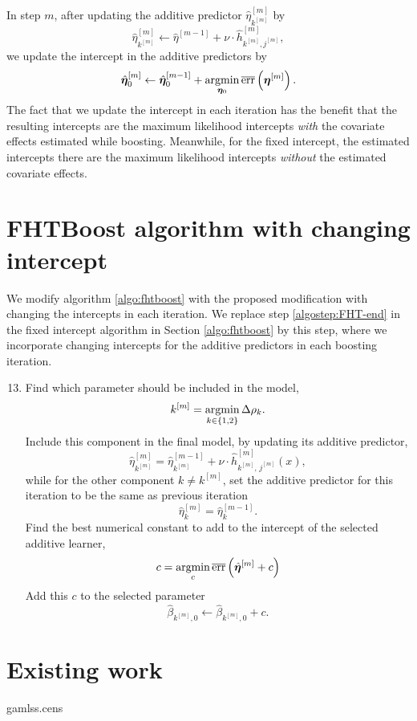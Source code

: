 In step $m$, after updating the additive predictor $\hat{\eta}^{[m]}_{k^{[m]}}$ by
\begin{equation*}
    \hat{\eta}^{[m]}_{k^{[m]}}\gets\hat{\eta}^{[m-1]}+\nu\cdot\hat{h}_{k^{[m]},j^{[m]}}^{[m]},
\end{equation*}
we update the intercept in the additive predictors by
\begin{equation*}
    \hat{\boldsymbol{\eta}}_0^{[m]}\gets\hat{\boldsymbol{\eta}}_0^{[m-1]}+\operatorname*{argmin}_{\boldsymbol{\eta}_0}\overline{\text{err}}\left(\boldsymbol{\eta}^{[m]}\right).
\end{equation*}
The fact that we update the intercept in each iteration has the benefit that the resulting intercepts are the maximum likelihood intercepts \textit{with} the covariate effects estimated while boosting.
Meanwhile, for the fixed intercept, the estimated intercepts there are the maximum likelihood intercepts \textit{without} the estimated covariate effects.


\section{FHTBoost algorithm with changing intercept}\label{subsec:FHT-intercept}
We modify algorithm \ref{algo:fhtboost} with the proposed modification with changing the intercepts in each iteration.
We replace step \ref{algostep:FHT-end} in the fixed intercept algorithm in Section \ref{algo:fhtboost} by this step, where we incorporate changing intercepts for the additive predictors in each boosting iteration.
\label{algo:fhtboost-with-intercept}
\begin{enumerate}
    \setcounter{enumi}{12}
    \item
        Find which parameter should be included in the model,
        \begin{equation*}
            k^{[m]}=\operatorname*{argmin}_{k\in\{1,2\}}\Delta\rho_k.
        \end{equation*}
        Include this component in the final model, by updating its additive predictor,
        \begin{equation*}
            \hat{\eta}^{[m]}_{k^{[m]}}=\hat{\eta}^{[m-1]}_{k^{[m]}}+\nu\cdot\hat{h}^{[m]}_{k^{[m]},\,j^{[m]}}(x),
        \end{equation*}
        while for the other component $k\neq k^{[m]}$, set the additive predictor for this iteration to be the same as previous iteration
        \begin{equation*}
            \hat{\eta}^{[m]}_{k}=\hat{\eta}^{[m-1]}_{k}.
        \end{equation*}
        Find the best numerical constant to add to the intercept of the selected additive learner,
        \begin{equation}
            c=\operatorname*{argmin}_c \overline{\text{err}}\left(\hat{\boldsymbol{\eta}}^{[m]}+c\right)
        \end{equation}
        Add this $c$ to the selected parameter
        \begin{equation}
            \hat{\beta}_{k^{[m]},0}\gets\hat{\beta}_{k^{[m]},0}+c.
        \end{equation}
\end{enumerate}

\section{Existing work}
gamlss.cens \citep{gamlsscens}